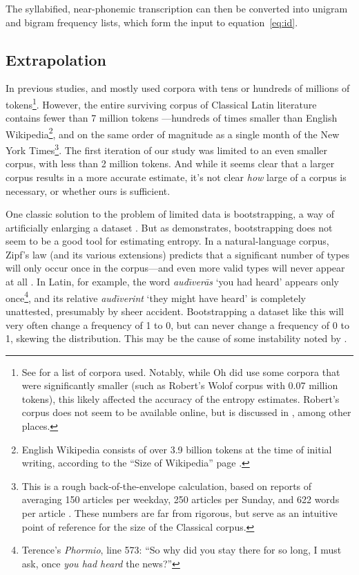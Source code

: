 \documentclass[12pt,twoside]{article}
\begin{document}
The syllabified, near-phonemic transcription can then be converted into unigram and bigram frequency lists, which form the input to equation~\ref{eq:id}.

\subsection{Extrapolation}
\label{subsec:extrapolate}

In previous studies, \citet{coupé} and \citet{oh} mostly used corpora with tens or hundreds of millions of tokens\footnote{See \citereset\cite[30-31]{oh} for a list of corpora used. Notably, while Oh did use some corpora that were significantly smaller (such as Robert's Wolof corpus with 0.07 million tokens), this likely affected the accuracy of the entropy estimates. Robert's corpus does not seem to be available online, but is discussed in \citet{robert}, among other places.}. However, the entire surviving corpus of Classical Latin literature contains fewer than 7 million tokens \citep{phi}---hundreds of times smaller than English Wikipedia\footnote{English Wikipedia consists of over 3.9 billion tokens at the time of initial writing, according to the ``Size of Wikipedia'' page \citep{wiki}.}, and on the same order of magnitude as a single month of the New York Times\footnote{This is a rough back-of-the-envelope calculation, based on reports of averaging 150 articles per weekday, 250 articles per Sunday, and 622 words per article \citep{meyer,menendez}. These numbers are far from rigorous, but serve as an intuitive point of reference for the size of the Classical corpus.}. The first iteration of our study was limited to an even smaller corpus, with less than 2 million tokens. And while it seems clear that a larger corpus results in a more accurate estimate, it's not clear \emph{how} large of a corpus is necessary, or whether ours is sufficient.

One classic solution to the problem of limited data is bootstrapping, a way of artificially enlarging a dataset \citep{oh,efron}. But as \citet[55-56]{oh} demonstrates, bootstrapping does not seem to be a good tool for estimating entropy. In a natural-language corpus, Zipf's law (and its various extensions) predicts that a significant number of types will only occur once in the corpus---and even more valid types will never appear at all \citep{davis}. In Latin, for example, the word \emph{aud\=\i{}ver\=as} `you had heard' appears only once\footnote{Terence's \emph{Phormio}, line 573: ``So why did you stay there for so long, I must ask, once \emph{you had heard} the news?''}, and its relative \emph{aud\=\i{}verint} `they might have heard' is completely unattested, presumably by sheer accident. Bootstrapping a dataset like this will very often change a frequency of 1 to 0, but can never change a frequency of 0 to 1, skewing the distribution. This may be the cause of some instability noted by \citet[56]{oh}.
\end{document}
